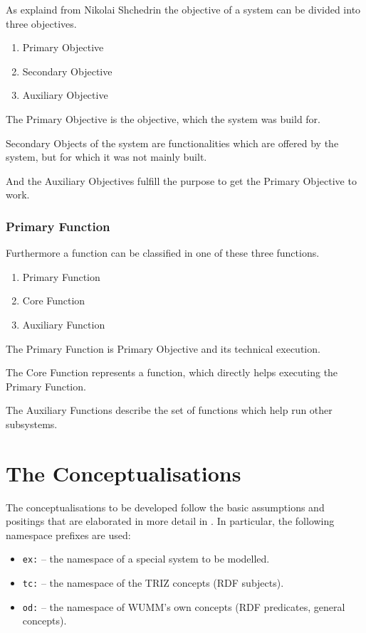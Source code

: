 \documentclass[11pt,a4paper]{article}
\begin{document}
As explaind from Nikolai Shchedrin the objective of a system can be divided into three objectives.

\begin{enumerate}[noitemsep]
	\item Primary Objective
	\item Secondary Objective
	\item Auxiliary Objective
\end{enumerate}

The Primary Objective is the objective, which the system was build for. 

Secondary Objects of the system are functionalities which are offered by the system, but for which it was not mainly built.

And the Auxiliary Objectives fulfill the purpose to get the Primary Objective to work.

\subsubsection{Primary Function}

Furthermore a function can be classified in one of these three functions.

\begin{enumerate}[noitemsep]
	\item Primary Function
	\item Core Function
	\item Auxiliary Function
\end{enumerate}

The Primary Function is Primary Objective and its technical execution. 

The Core Function represents a function, which directly helps executing the Primary Function.

The Auxiliary Functions describe the set of functions which help run other subsystems.

\section{The Conceptualisations}

The conceptualisations to be developed follow the basic assumptions and
positings that are elaborated in more detail in \cite{Graebe2021}. In
particular, the following namespace prefixes are used:
\begin{itemize}[noitemsep]
  \item \texttt{ex:} -- the namespace of a special system to be modelled. 
  \item \texttt{tc:} -- the namespace of the TRIZ concepts (RDF subjects).
  \item \texttt{od:} -- the namespace of WUMM's own concepts (RDF predicates, 
  	general concepts). 
\end{itemize}
\end{document}
